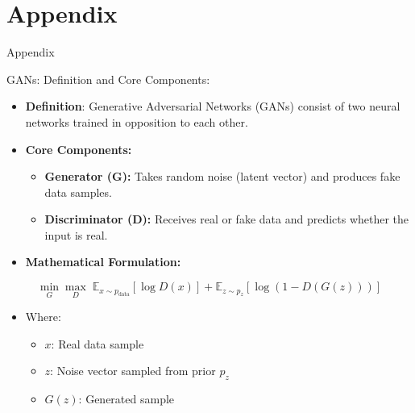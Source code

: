 \section*{Appendix}
\begin{frame}[allowframebreaks]{Appendix}
\begin{block}{GANs: Definition and Core Components:}
    \begin{itemize}
        \item \textbf{Definition}: Generative Adversarial Networks (GANs) consist of two neural networks trained in opposition to each other.
        \item \textbf{Core Components:}
        \begin{itemize}
            \item \textbf{Generator (G):} Takes random noise (latent vector) and produces fake data samples.
            \item \textbf{Discriminator (D):} Receives real or fake data and predicts whether the input is real.
        \end{itemize}
        \item \textbf{Mathematical Formulation:}
    \end{itemize}
    \begin{equation*}
        \min_G \max_D \; \mathbb{E}_{x \sim p_{\text{data}}} [\log D(x)] + \mathbb{E}_{z \sim p_z} [\log(1 - D(G(z)))]
    \end{equation*}
    \begin{itemize}
        \item[] Where:
        \begin{itemize}
            \item $x$: Real data sample
            \item $z$: Noise vector sampled from prior $p_z$
            \item $G(z)$: Generated sample
        \end{itemize}
    \end{itemize}
\end{block}


\end{frame}